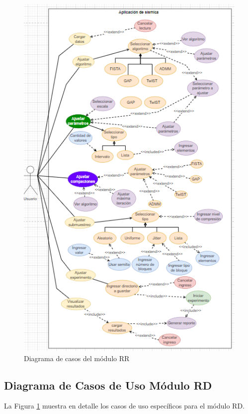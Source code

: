 \documentclass[12pt,twoside,letter]{ol-softwaremanual}
\begin{document}
\begin{figure}
	\centering
	\includegraphics[width=0.7\linewidth]{figures/screenshot009}
	\caption{Diagrama de casos del módulo RR}
	\label{fig:screenshot009}
\end{figure}

\subsection{Diagrama de Casos de Uso Módulo RD}

La Figura \ref{fig:screenshot009} muestra en detalle los casos de uso específicos para el módulo RD.
\end{document}
